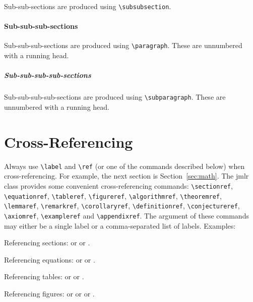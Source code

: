\documentclass[pmlr]{jmlr}
\begin{document}
Sub-sub-sections are produced using \verb|\subsubsection|.

\paragraph{Sub-sub-sub-sections}

Sub-sub-sub-sections are produced using \verb|\paragraph|.
These are unnumbered with a running head.

\subparagraph{Sub-sub-sub-sub-sections}

Sub-sub-sub-sub-sections are produced using \verb|\subparagraph|.
These are unnumbered with a running head.

\section{Cross-Referencing}

Always use \verb|\label| and \verb|\ref| (or one of the commands
described below) when cross-referencing.  For example, the next
section is Section~\ref{sec:math}. The \textsf{jmlr} class
provides some convenient cross-referencing commands:
\verb|\sectionref|, \verb|\equationref|, \verb|\tableref|,
\verb|\figureref|, \verb|\algorithmref|, \verb|\theoremref|,
\verb|\lemmaref|, \verb|\remarkref|, \verb|\corollaryref|,
\verb|\definitionref|, \verb|\conjectureref|, \verb|\axiomref|,
\verb|\exampleref| and \verb|\appendixref|. The argument of these
commands may either be a single label or a comma-separated list
of labels. Examples:

Referencing sections:  or
 or
.

Referencing equations:  or
 or
.

Referencing tables:  or
 or
.

Referencing figures:  or
 or
 or
.
\end{document}
